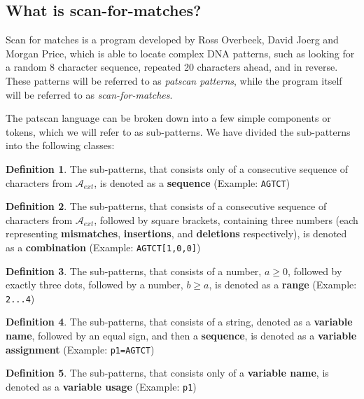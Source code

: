 \documentclass[12pt]{article}
\theoremstyle{definition}
\newtheorem{mydef}{Definition}
\begin{document}
\subsection{What is scan-for-matches?}

Scan for matches is a program developed by Ross Overbeek, David Joerg and Morgan Price\cite{scan-for-matches}, which is able to locate complex DNA patterns, such as looking for a random 8 character sequence, repeated 20 characters ahead, and in reverse. These patterns will be referred to as \textit{patscan patterns}, while the program itself will be referred to as \textit{scan-for-matches}.

The patscan language can be broken down into a few simple components or tokens, which we will refer to as sub-patterns. We have divided the sub-patterns into the following classes:

\begin{mydef}
The sub-patterns, that consists only of a consecutive sequence of characters from $\mathcal{A}_{ext}$, is denoted as a \textbf{sequence} (Example: \texttt{AGTCT})
\end{mydef}

\begin{mydef}
The sub-patterns, that consists of a consecutive sequence of characters from $\mathcal{A}_{ext}$, followed by square brackets, containing three numbers (each representing \textbf{mismatches}, \textbf{insertions}, and \textbf{deletions} respectively), is denoted as a \textbf{combination} (Example: \texttt{AGTCT[1,0,0]})
\end{mydef}

\begin{mydef}
The sub-patterns, that consists of a number, $a \geq 0$, followed by exactly three dots, followed by a number, $b \geq a$, is denoted as a \textbf{range} (Example: \texttt{2...4})
\end{mydef}

\begin{mydef}
The sub-patterns, that consists of a string, denoted as a \textbf{variable name}, followed by an equal sign, and then a \textbf{sequence}, is denoted as a \textbf{variable assignment} (Example: \texttt{p1=AGTCT})
\end{mydef}

\begin{mydef}
The sub-patterns, that consists only of a \textbf{variable name}, is denoted as a \textbf{variable usage} (Example: \texttt{p1})
\end{mydef}
\end{document}
